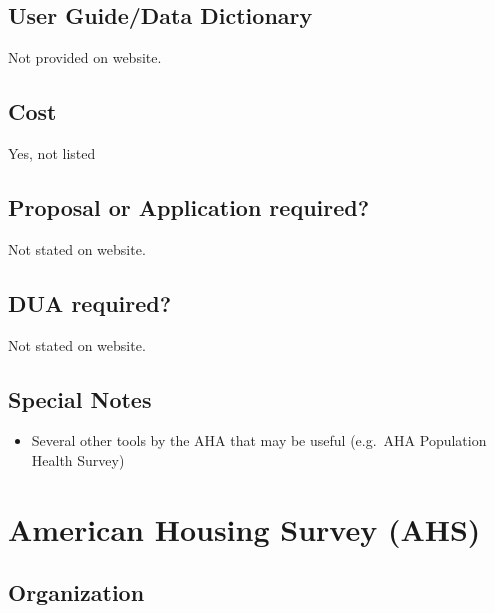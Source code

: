 \documentclass[
]{book}
\providecommand{\tightlist}{%
  \setlength{\itemsep}{0pt}\setlength{\parskip}{0pt}}
\begin{document}
\hypertarget{user-guidedata-dictionary-5}{%
\section{User Guide/Data Dictionary}\label{user-guidedata-dictionary-5}}

Not provided on website.

\hypertarget{cost-5}{%
\section{Cost}\label{cost-5}}

Yes, not listed

\hypertarget{proposal-or-application-required-5}{%
\section{Proposal or Application required?}\label{proposal-or-application-required-5}}

Not stated on website.

\hypertarget{dua-required-5}{%
\section{DUA required?}\label{dua-required-5}}

Not stated on website.

\hypertarget{special-notes-5}{%
\section{Special Notes}\label{special-notes-5}}

\begin{itemize}
\tightlist
\item
  Several other tools by the AHA that may be useful (e.g.~AHA Population Health Survey)
\end{itemize}

\mainmatter

\hypertarget{american-housing-survey-ahs}{%
\chapter{American Housing Survey (AHS)}\label{american-housing-survey-ahs}}

\hypertarget{organization-6}{%
\section{Organization}\label{organization-6}}
\end{document}
